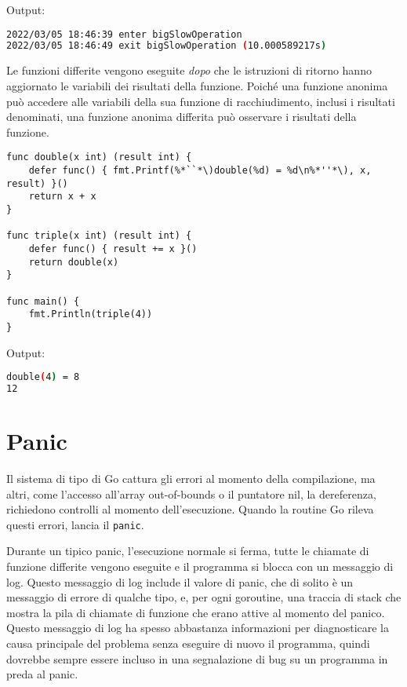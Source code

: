 Output:
\begin{lstlisting}[language=bash, frame=L, label={lst:lstlisting4-8.4}]
2022/03/05 18:46:39 enter bigSlowOperation
2022/03/05 18:46:49 exit bigSlowOperation (10.000589217s)
\end{lstlisting}
Le funzioni differite vengono eseguite \textit{dopo} che le istruzioni di ritorno hanno aggiornato le variabili dei risultati della funzione.
Poiché una funzione anonima può accedere alle variabili della sua funzione di racchiudimento, inclusi i risultati denominati, una funzione anonima differita può osservare i risultati della funzione.
\begin{lstlisting}[frame=single, label={lst:lstlisting4-8.5}]
func double(x int) (result int) {
    defer func() { fmt.Printf(%*``*\)double(%d) = %d\n%*''*\), x, result) }()
    return x + x
}

func triple(x int) (result int) {
    defer func() { result += x }()
    return double(x)
}

func main() {
    fmt.Println(triple(4))
}
\end{lstlisting}
Output:
\begin{lstlisting}[language=bash, frame=L, label={lst:lstlisting4-8.6}]
double(4) = 8
12
\end{lstlisting}


\section{Panic}
\label{sec:panic}%
Il sistema di tipo di Go cattura gli errori al momento della compilazione, ma altri, come l'accesso all'array out-of-bounds o il puntatore nil, la dereferenza, richiedono controlli al momento dell'esecuzione.
Quando la routine Go rileva questi errori, lancia il \verb|panic|.

Durante un tipico panic, l'esecuzione normale si ferma, tutte le chiamate di funzione differite vengono eseguite e il programma si blocca con un messaggio di log.
Questo messaggio di log include il valore di panic, che di solito è un messaggio di errore di qualche tipo, e, per ogni goroutine, una traccia di stack che mostra la pila di chiamate di funzione che erano attive al momento del panico.
Questo messaggio di log ha spesso abbastanza informazioni per diagnosticare la causa principale del problema senza eseguire di nuovo il programma, quindi dovrebbe sempre essere incluso in una segnalazione di bug su un programma in preda al panic.